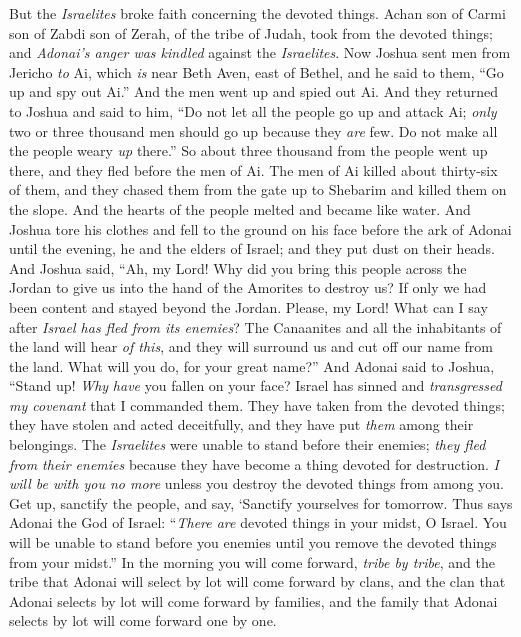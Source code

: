 \begin{biblechapter} %
 But the \textit{Israelites} broke faith concerning the devoted things. Achan son of Carmi son of Zabdi son of Zerah, of the tribe of Judah, took from the devoted things; and \textit{Adonai’s anger was kindled} against the \textit{Israelites}.
\verse Now Joshua sent men from Jericho \textit{to} Ai, which \textit{is} near Beth Aven, east of Bethel, and he said to them, “Go up and spy out Ai.” And the men went up and spied out Ai.
\verse And they returned to Joshua and said to him, “Do not let all the people go up and attack Ai; \textit{only} two or three thousand men should go up because they \textit{are} few. Do not make all the people weary \textit{up} there.”
\verse So about three thousand from the people went up there, and they fled before the men of Ai.
\verse The men of Ai killed about thirty-six of them, and they chased them from the gate up to Shebarim and killed them on the slope. And the hearts of the people melted and became like water.
\verse And Joshua tore his clothes and fell to the ground on his face before the ark of Adonai until the evening, he and the elders of Israel; and they put dust on their heads.
\verse And Joshua said, “Ah, my Lord! Why did you bring this people across the Jordan to give us into the hand of the Amorites to destroy us? If only we had been content and stayed beyond the Jordan.
\verse Please, my Lord! What can I say after \textit{Israel has fled from its enemies}?
\verse The Canaanites and all the inhabitants of the land will hear \textit{of this}, and they will surround us and cut off our name from the land. What will you do, for your great name?”
\verse And Adonai said to Joshua, “Stand up! \textit{Why} \textit{have} you fallen on your face?
\verse Israel has sinned and \textit{transgressed my covenant} that I commanded them. They have taken from the devoted things; they have stolen and acted deceitfully, and they have put \textit{them} among their belongings.
\verse The \textit{Israelites} were unable to stand before their enemies; \textit{they fled from their enemies} because they have become a thing devoted for destruction. \textit{I will be with you no more} unless you destroy the devoted things from among you.
\verse Get up, sanctify the people, and say, ‘Sanctify yourselves for tomorrow. Thus says Adonai the God of Israel: “\textit{There are} devoted things in your midst, O Israel. You will be unable to stand before you enemies until you remove the devoted things from your midst.”
\verse In the morning you will come forward, \textit{tribe by tribe}, and the tribe that Adonai will select by lot will come forward by clans, and the clan that Adonai selects by lot will come forward by families, and the family that Adonai selects by lot will come forward one by one.

\end{biblechapter}
